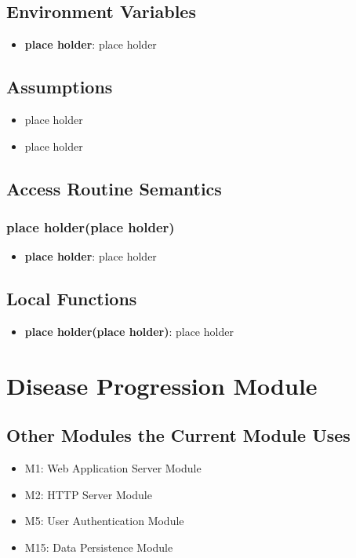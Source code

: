 \documentclass[12pt, titlepage]{article}
\begin{document}
\subsection{Environment Variables}
\begin{itemize}
\item \textbf{place holder}: place holder
\end{itemize}

\subsection{Assumptions}
\begin{itemize}
    \item place holder
    \item place holder
\end{itemize}


\subsection{Access Routine Semantics}
\subsubsection{place holder(place holder)}
\begin{itemize}
    \item \textbf{place holder}: place holder
\end{itemize}

\subsection{Local Functions}
\begin{itemize}
\item \textbf{place holder(place holder)}: place holder
\end{itemize}

\section{Disease Progression Module}
\label{Disease Progression Module}

\subsection{Other Modules the Current Module Uses}
\begin{itemize}
    \item M1: Web Application Server Module
    \item M2: HTTP Server Module
    \item M5: User Authentication Module
    \item M15: Data Persistence Module
\end{itemize}
\end{document}
